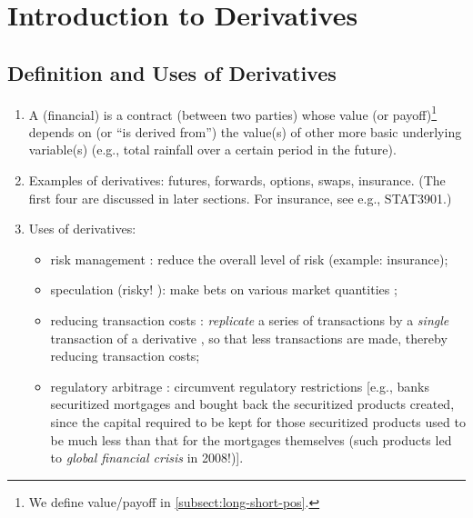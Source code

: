 \section{Introduction to Derivatives}
\label{sect:intro-deriv}
\subsection{Definition and Uses of Derivatives}
\begin{enumerate}
\item A (financial)  is a contract  (between
two parties) whose value (or payoff)\footnote{We define value/payoff in
\cref{subsect:long-short-pos}.} depends on (or ``is derived from'') the value(s)
of other more basic underlying variable(s) (e.g., total rainfall
 over a certain period in the future).

\item Examples of derivatives: futures, forwards, options, swaps, insurance.
(The first four are discussed in later sections. For insurance, see e.g.,
STAT3901.)

\item Uses of derivatives:
\begin{itemize}
\item risk management : reduce the overall level of risk
 (example: insurance);

\item speculation  (risky!
{\color{red}}): make bets  on
various market quantities ;

\item reducing transaction costs 
: \emph{replicate}  a
series of transactions
  
by a \emph{single} transaction  of a derivative
, so that less transactions are made, thereby reducing
transaction costs;

\item regulatory arbitrage : circumvent regulatory
restrictions  [e.g., banks  securitized mortgages
 and bought back the securitized products created, since the
capital required to be kept for those securitized products used to be much less
than that for the mortgages themselves \parencite[Section~8.3]{hull2022options}
(such products led to \emph{global financial crisis}  in 2008!)].
\end{itemize}
\end{enumerate}

